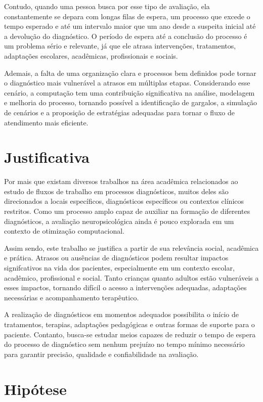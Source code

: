\documentclass[
    12pt,                %
    openright,           %
    oneside,             %
    a4paper,             %
    english,             %
    brazil               %
]{abntex2}
\begin{document}
Contudo, quando uma pessoa busca por esse tipo de avaliação, ela constantemente se depara com longas filas de espera, um processo que excede o tempo esperado e até um intervalo maior que um ano desde a suspeita inicial até a devolução do diagnóstico. O período de espera até a conclusão do processo é um problema sério e relevante, já que ele atrasa intervenções, tratamentos, adaptações escolares, acadêmicas, profissionais e sociais.

Ademais, a falta de uma organização clara e processos bem definidos pode tornar o diagnóstico mais vulnerável a atrasos em múltiplas etapas. Considerando esse cenário, a computação tem uma contribuição significativa na análise, modelagem e melhoria do processo, tornando possível a identificação de gargalos, a simulação de cenários e a proposição de estratégias adequadas para tornar o fluxo de atendimento mais eficiente.

\section{Justificativa}

Por mais que existam diversos trabalhos na área acadêmica relacionados ao estudo de fluxos de trabalho em processos diagnósticos, muitos deles são direcionados a locais específicos, diagnósticos específicos ou contextos clínicos restritos. Como um processo amplo capaz de auxiliar na formação de diferentes diagnósticos, a avaliação neuropsicológica ainda é pouco explorada em um contexto de otimização computacional. 

Assim sendo, este trabalho se justifica a partir de sua relevância social, acadêmica e prática. Atrasos ou ausências de diagnósticos podem resultar impactos signifcativos na vida dos pacientes, especialmente em um contexto escolar, acadêmico, profissional e social. Tanto crianças quanto adultos estão vulneráveis a esses impactos, tornando difícil o acesso a intervenções adequadas, adaptações necessárias e acompanhamento terapêutico.

A realização de diagnósticos em momentos adequados possibilita o início de tratamentos, terapias, adaptações pedagógicas e outras formas de suporte para o paciente. Contanto, busca-se estudar meios capazes de reduzir o tempo de espera do processo de diagnóstico sem nenhum prejuízo no tempo mínimo necessário para garantir precisão, qualidade e confiabilidade na avaliação.

\section{Hipótese}
\end{document}
